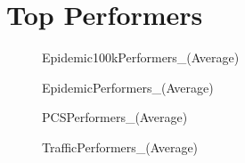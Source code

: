 \section{Top Performers}
\begin{figure}[H]
\centering

\caption{Epidemic100kPerformers\_(Average)}
\end{figure}
\vspace{1cm}
\begin{figure}[H]
\centering

\caption{EpidemicPerformers\_(Average)}
\end{figure}
\vspace{1cm}
\newpage
\begin{figure}[H]
\centering

\caption{PCSPerformers\_(Average)}
\end{figure}
\vspace{1cm}
\begin{figure}[H]
\centering

\caption{TrafficPerformers\_(Average)}
\end{figure}
\vspace{1cm}